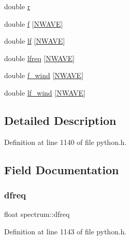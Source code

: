 \begin{DoxyCompactItemize}
\item 
double \hyperlink{structspectrum_a9903de0f564e82023d6c000c1cc6c208}{r}
\item 
double \hyperlink{structspectrum_a4df84a7e42b079c620667d1bd4c4b84f}{f} \mbox{[}\hyperlink{python_8h_a466538c019bc48c22053d7807c5ac843}{N\+W\+A\+VE}\mbox{]}
\item 
double \hyperlink{structspectrum_ae4378fec92cbe74ba06f0d5af8baf787}{lf} \mbox{[}\hyperlink{python_8h_a466538c019bc48c22053d7807c5ac843}{N\+W\+A\+VE}\mbox{]}
\item 
double \hyperlink{structspectrum_ad6b162a83a1e4fa4c5a8719bb50a91f5}{lfreq} \mbox{[}\hyperlink{python_8h_a466538c019bc48c22053d7807c5ac843}{N\+W\+A\+VE}\mbox{]}
\item 
double \hyperlink{structspectrum_a460853aa5df0174e31b6a406b251a4ec}{f\+\_\+wind} \mbox{[}\hyperlink{python_8h_a466538c019bc48c22053d7807c5ac843}{N\+W\+A\+VE}\mbox{]}
\item 
double \hyperlink{structspectrum_a43fdc92d4278b80d96cbe2ee62f10566}{lf\+\_\+wind} \mbox{[}\hyperlink{python_8h_a466538c019bc48c22053d7807c5ac843}{N\+W\+A\+VE}\mbox{]}
\end{DoxyCompactItemize}


\subsection{Detailed Description}


Definition at line 1140 of file python.\+h.



\subsection{Field Documentation}
\mbox{\label{structspectrum_a1f6c195a4ff585124412ee2718243318}} 
\subsubsection{\texorpdfstring{dfreq}{dfreq}}
{\footnotesize\ttfamily float spectrum\+::dfreq}



Definition at line 1143 of file python.\+h.

\mbox{\label{structspectrum_a4df84a7e42b079c620667d1bd4c4b84f}} 
